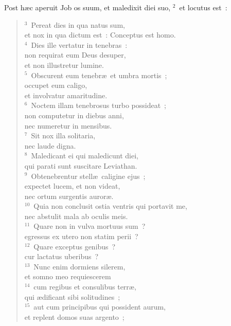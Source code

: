 \lettrine[lines=3,image=true,loversize=0.05,lraise=-0.03]{P}{}ost h\ae c aperuit Job os suum, et maledixit diei suo,
${}^{2}$~et locutus est~:
\begin{flushleft}\begin{verse}${}^{3}$~Pereat dies in qua natus sum,\\ et nox in qua dictum est~: Conceptus est homo.\\
${}^{4}$~Dies ille vertatur in tenebras~:\\ non requirat eum Deus desuper,\\ et non illustretur lumine.\\
${}^{5}$~Obscurent eum tenebr\ae\ et umbra mortis~;\\ occupet eum caligo,\\ et involvatur amaritudine.\\
${}^{6}$~Noctem illam tenebrosus turbo possideat~;\\ non computetur in diebus anni,\\ nec numeretur in mensibus.\\
${}^{7}$~Sit nox illa solitaria,\\ nec laude digna.\\
${}^{8}$~Maledicant ei qui maledicunt diei,\\ qui parati sunt suscitare Leviathan.\\
${}^{9}$~Obtenebrentur stell\ae\ caligine ejus~;\\ expectet lucem, et non videat,\\ nec ortum surgentis auror\ae .\\
${}^{10}$~Quia non conclusit ostia ventris qui portavit me,\\ nec abstulit mala ab oculis meis.\\
${}^{11}$~Quare non in vulva mortuus sum~?\\ egressus ex utero non statim perii~?\\
${}^{12}$~Quare exceptus genibus~?\\ cur lactatus uberibus~?\\
${}^{13}$~Nunc enim dormiens silerem,\\ et somno meo requiescerem\\
${}^{14}$~cum regibus et consulibus terr\ae ,\\ qui \ae dificant sibi solitudines~;\\
${}^{15}$~aut cum principibus qui possident aurum,\\ et replent domos suas argento~;\\

\end{verse}
\end{flushleft}
